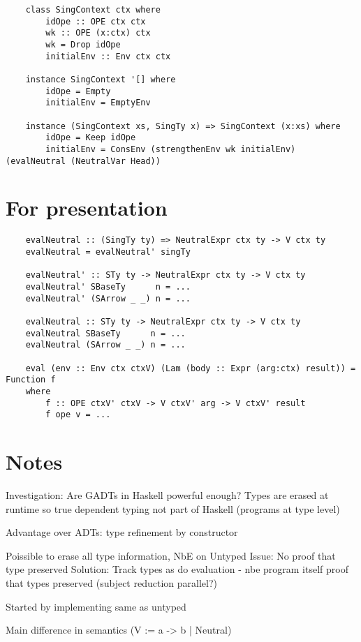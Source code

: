 \begin{lstlisting}
    class SingContext ctx where
        idOpe :: OPE ctx ctx
        wk :: OPE (x:ctx) ctx
        wk = Drop idOpe
        initialEnv :: Env ctx ctx

    instance SingContext '[] where
        idOpe = Empty
        initialEnv = EmptyEnv

    instance (SingContext xs, SingTy x) => SingContext (x:xs) where
        idOpe = Keep idOpe
        initialEnv = ConsEnv (strengthenEnv wk initialEnv) (evalNeutral (NeutralVar Head))
\end{lstlisting}

\section{For presentation}

\begin{lstlisting}
    evalNeutral :: (SingTy ty) => NeutralExpr ctx ty -> V ctx ty
    evalNeutral = evalNeutral' singTy

    evalNeutral' :: STy ty -> NeutralExpr ctx ty -> V ctx ty
    evalNeutral' SBaseTy      n = ...
    evalNeutral' (SArrow _ _) n = ...

    evalNeutral :: STy ty -> NeutralExpr ctx ty -> V ctx ty
    evalNeutral SBaseTy      n = ...
    evalNeutral (SArrow _ _) n = ...

    eval (env :: Env ctx ctxV) (Lam (body :: Expr (arg:ctx) result)) = Function f 
    where
        f :: OPE ctxV' ctxV -> V ctxV' arg -> V ctxV' result
        f ope v = ...
\end{lstlisting}

\section{Notes}

Investigation: Are GADTs in Haskell powerful enough? Types are erased at runtime so true dependent typing not part of Haskell (programs at type level)

Advantage over ADTs: type refinement by constructor

Poissible to erase all type information, NbE on Untyped
Issue: No proof that type preserved 
Solution: Track types as do evaluation - nbe program itself proof that types preserved (subject reduction parallel?)

Started by implementing same as untyped

Main difference in semantics (V := a -> b | Neutral) 
\cite{slides}

